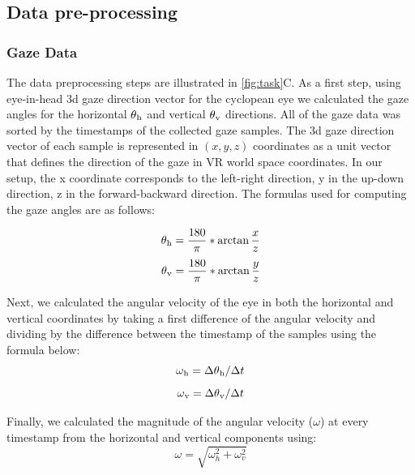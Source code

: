 \subsection{Data pre-processing}

\subsubsection{Gaze Data}

The data preprocessing steps are illustrated in \ref{fig:task}C. As a first step, using eye-in-head 3d gaze direction vector for the cyclopean eye we calculated the gaze angles for the horizontal $\theta\textsubscript{h}$ and vertical $\theta\textsubscript{v}$ directions. All of the gaze data was sorted by the timestamps of the collected gaze samples. The 3d gaze direction vector of each sample is represented in $(x, y, z)$ coordinates as a unit vector that defines the direction of the gaze in VR world space coordinates. In our setup, the x coordinate corresponds to the left-right direction, y in the up-down direction, z in the forward-backward direction. The formulas used for computing the gaze angles are as follows:

 \begin{equation}\label{eq:h_angle}
     \theta\textsubscript{h} = \frac{180}{\pi} * \arctan{\frac{x}{z}}
 \end{equation}   
  \begin{equation}\label{eq:v_angle}
     \theta\textsubscript{v} = \frac{180}{\pi} * \arctan{\frac{y}{z}} 
 \end{equation}   
 
Next, we calculated the angular velocity of the eye in both the horizontal and vertical coordinates by taking a first difference of the angular velocity and dividing by the difference between the timestamp of the samples using the formula below:
\begin{equation}\label{eq:h_vel_angle}
    \omega\textsubscript{h} = \Delta\theta\textsubscript{h} / \Delta t
 \end{equation}  
 \begin{equation}\label{eq:v_vel_angle}
     \omega\textsubscript{v} = \Delta\theta\textsubscript{v} / \Delta t
 \end{equation}  

Finally, we calculated the magnitude of the angular velocity ($\omega$) at every timestamp from the horizontal and vertical components using:
\begin{equation}\label{eq:vel_angle}
     \omega = \sqrt{\omega_h^2 + \omega_v^2}
 \end{equation}  

